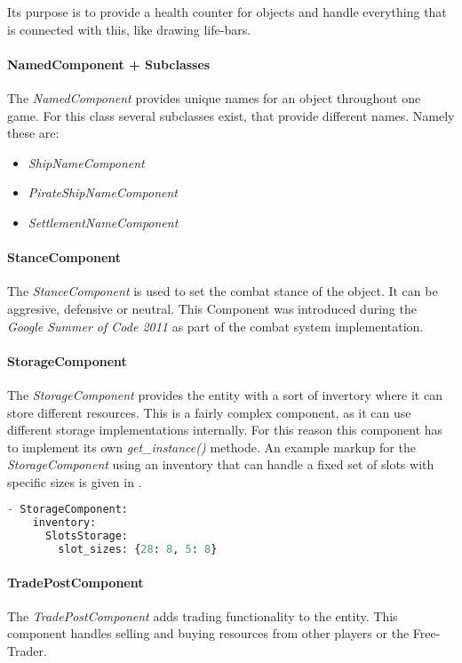 Its purpose is to provide a health counter for objects and handle everything that is connected with this, like drawing
life-bars.

\paragraph{NamedComponent + Subclasses}
The \textit{NamedComponent} provides unique names for an object throughout one game. For this class several subclasses
exist, that provide different names. Namely these are:
\begin{itemize}
    \item \textit{ShipNameComponent}
    \item \textit{PirateShipNameComponent}
    \item \textit{SettlementNameComponent}
\end{itemize}

\paragraph{StanceComponent}
The \textit{StanceComponent} is used to set the combat stance of the object. It can be aggresive, defensive or neutral.
This Component was introduced during the \textit{Google Summer of Code 2011} as part of the combat system
implementation.

\paragraph{StorageComponent}
The \textit{StorageComponent} provides the entity with a sort of invertory where it can store different resources. This
is a fairly complex component, as it can use different storage implementations internally. For this reason this
component has to implement its own \textit{get\_instance()} methode. An example markup for the \textit{StorageComponent}
using an inventory that can handle a fixed set of slots with specific sizes is given in .

\begin{lstlisting}[language=python,caption=YAML representation of the StorageComponent using a SlotStorage,
label=storagyaml]
- StorageComponent:
    inventory:
      SlotsStorage:
        slot_sizes: {28: 8, 5: 8}
\end{lstlisting}

\paragraph{TradePostComponent}
The \textit{TradePostComponent} adds trading functionality to the entity. This component handles selling and buying
resources from other players or the Free-Trader.

